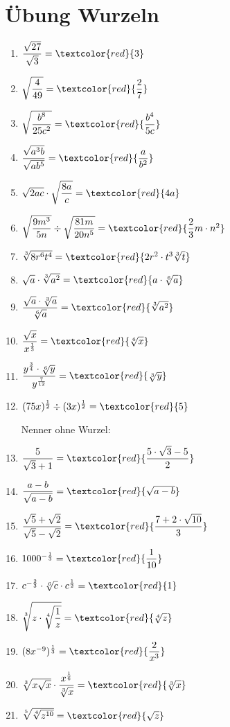 \documentclass[11pt, a4paper, twoside, fleqn]{article}
\begin{document}
\newpage

\section{Übung Wurzeln}
\begin{enumerate} [itemsep=3ex]
\item $ \dfrac{\sqrt{27}}{\sqrt{3}} = \textcolor{red}{3} $
\item $ \sqrt{\dfrac{4}{49}} = \textcolor{red}{\dfrac{2}{7}} $
\item $ \sqrt{\dfrac{b^{8}}{25c^{2}}} = \textcolor{red}{\dfrac{b^{4}}{5c}} $
\item $ \dfrac{\sqrt{a^{3}b}}{\sqrt{ab^{5}}} = \textcolor{red}{\dfrac{a}{b^{2}}} $
\item $ \sqrt{2ac} \cdot \sqrt{\dfrac{8a}{c}} = \textcolor{red}{4a} $
\item $ \sqrt{\dfrac{9m^{3}}{5n}} \div \sqrt{\dfrac{81m}{20n^{5}}} = \textcolor{red}{\dfrac{2}{3} m \cdot n^{2}} $
\item $ \sqrt[3]{8r^{6}t^{4}} = \textcolor{red}{2r^{2} \cdot t^{3} \sqrt[3]{t}} $
\item $\sqrt{a} \cdot \sqrt[3]{a^{2}} = \textcolor{red}{ a \cdot \sqrt[6]{a}}$
\item $ \dfrac{\sqrt{a} \cdot \sqrt[3]{a}}{\sqrt[6]{a}} = \textcolor{red}{\sqrt[3]{a^{2}}} $
\item $ \dfrac{\sqrt{x}}{x^{\frac{1}{3}}} = \textcolor{red}{\sqrt[6]{x}} $
\item $ \dfrac{y^{\frac{3}{4}} \cdot \sqrt[6]{y}}{y^{\frac{7}{12}}} = \textcolor{red}{\sqrt[3]{y}} $
\item $ (75x)^{\frac{1}{2}} \div (3x)^{\frac{1}{2}} = \textcolor{red}{5} $

Nenner ohne Wurzel:

\item $ \dfrac{5}{\sqrt{3} + 1} = \textcolor{red}{\dfrac{5 \cdot \sqrt{3} - 5}{2}} $
\item $ \dfrac{a - b}{\sqrt{a - b}} = \textcolor{red}{\sqrt{a - b}} $
\item $ \dfrac{\sqrt{5} + \sqrt{2}}{\sqrt{5} - \sqrt{2}} = \textcolor{red}{\dfrac{7 +2 \cdot \sqrt{10}}{3}} $
\item $ 1000^{- \frac{1}{3}} = \textcolor{red}{\dfrac{1}{10}} $
\item $ c^{- \frac{2}{3}} \cdot \sqrt[6]{c} \cdot c^{\frac{1}{2}} = \textcolor{red}{1} $
\item $ \sqrt[3]{z \cdot \sqrt[4]{\dfrac{1}{z}}} = \textcolor{red}{\sqrt[4]{z}} $
\item $ (8x^{-9})^{\frac{1}{3}} = \textcolor{red}{\dfrac{2}{x^{3}}} $
\item $ \sqrt[3]{x\sqrt{x}} \cdot \dfrac{x^{\frac{1}{6}}}{\sqrt[3]{x}} = \textcolor{red}{\sqrt[3]{x}} $
\item $ \sqrt[5]{\sqrt[4]{z^{10}}}= \textcolor{red}{\sqrt{z}} $
\end{enumerate}
\end{document}
